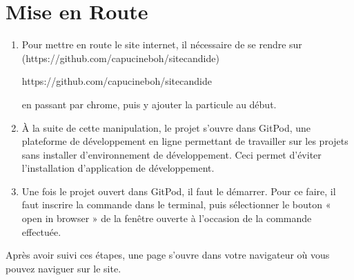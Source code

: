 \documentclass[a4,10pt,french]{sphinxmanual}
\begin{document}
\section{Mise en Route}
\label{\detokenize{chapitre-02:mise-en-route}}\begin{enumerate}
%
\item {} 
\sphinxAtStartPar
Pour mettre en route le site internet, il nécessaire de se rendre sur  (https://github.com/capucineboh/site\sphinxhyphen{}candide)\sphinxstepexplicit %
\begin{footnote}[1]\label{\thesphinxscope.1}%
\sphinxAtStartFootnote
https://github.com/capucineboh/site\sphinxhyphen{}candide
%
\end{footnote} en passant par chrome, puis y ajouter la particule  au début.

\item {} 
\sphinxAtStartPar
À la suite de cette manipulation, le projet s’ouvre dans GitPod, une plateforme de développement en ligne permettant de travailler sur les projets sans installer d’environnement de développement. Ceci permet d’éviter l’installation d’application de développement.

\item {} 
\sphinxAtStartPar
Une fois le projet ouvert dans GitPod, il faut le démarrer. Pour ce faire, il faut inscrire la commande  dans le terminal, puis sélectionner le bouton « open in browser » de la fenêtre ouverte à l’occasion de la commande effectuée.

\end{enumerate}

\sphinxAtStartPar
Après avoir suivi ces étapes, une page s’ouvre dans votre navigateur où vous pouvez naviguer sur le site.
\end{document}
